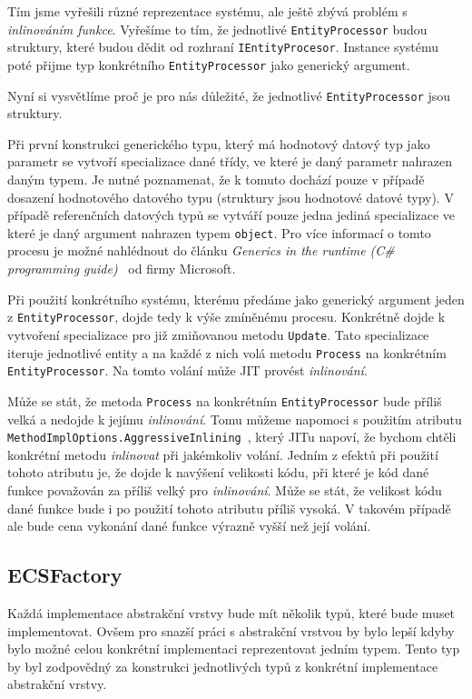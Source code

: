 Tím jsme vyřešili různé reprezentace systému, ale ještě zbývá problém s \textit{inlinováním funkce}. Vyřešíme to tím, že jednotlivé \verb|EntityProcessor| budou struktury, které budou dědit od rozhraní \verb|IEntityProcesor|. Instance systému poté přijme typ konkrétního \verb|EntityProcessor| jako generický argument.

Nyní si vysvětlíme proč je pro nás důležité, že jednotlivé \verb|EntityProcessor| jsou struktury.

Při první konstrukci generického typu, který má hodnotový datový typ jako parametr se vytvoří specializace dané třídy, ve které je daný parametr nahrazen daným typem. Je nutné poznamenat, že k tomuto dochází pouze v případě dosazení hodnotového datového typu (struktury jsou hodnotové datové typy). V případě referenčních datových typů se vytváří pouze jedna jediná specializace ve které je daný argument nahrazen typem \verb|object|. Pro více informací o tomto procesu je možné nahlédnout do článku \textit{Generics in the runtime (C\# programming guide)}~\cite{GenericsInTheRuntime} od firmy Microsoft.

Při použití konkrétního systému, kterému předáme jako generický argument jeden z \verb|EntityProcessor|, dojde tedy k výše zmíněnému procesu. Konkrétně dojde k vytvoření specializace pro již zmiňovanou metodu \verb|Update|. Tato specializace iteruje jednotlivé entity a na každé z nich volá metodu \verb|Process| na konkrétním \verb|EntityProcessor|. Na tomto volání může JIT provést \textit{inlinování}.

Může se stát, že metoda \verb|Process| na konkrétním \verb|EntityProcessor| bude příliš velká a nedojde k jejímu \textit{inlinování}. Tomu můžeme napomoci s použitím atributu \verb|MethodImplOptions.AggressiveInlining|~\cite{MethodImplOptions}, který JITu napoví, že bychom chtěli konkrétní metodu \textit{inlinovat} při jakémkoliv volání. Jedním z efektů při použití tohoto atributu je, že dojde k navýšení velikosti kódu, při které je kód dané funkce považován za příliš velký pro \textit{inlinování}. Může se stát, že velikost kódu dané funkce bude i po použití tohoto atributu příliš vysoká. V takovém případě ale bude cena vykonání dané funkce výrazně vyšší než její volání. 

\subsection{ECSFactory}
Každá implementace abstrakční vrstvy bude mít několik typů, které bude muset implementovat. Ovšem pro snazší práci s abstrakční vrstvou by bylo lepší kdyby bylo možné celou konkrétní implementaci reprezentovat jedním typem. Tento typ by byl zodpovědný za konstrukci jednotlivých typů z konkrétní implementace abstrakční vrstvy.

